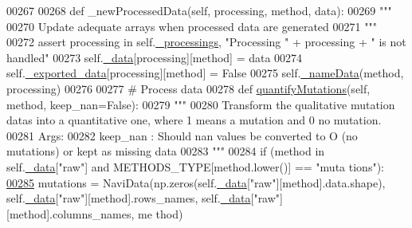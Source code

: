 \begin{DoxyCode}
00267 
00268     \textcolor{keyword}{def }\_newProcessedData(self, processing, method, data):
00269         \textcolor{stringliteral}{"""}
00270 \textcolor{stringliteral}{        Update adequate arrays when processed data are generated}
00271 \textcolor{stringliteral}{        """}
00272         \textcolor{keyword}{assert} processing \textcolor{keywordflow}{in} self.\hyperlink{classnavicom_1_1navicom_1_1NaviCom_ac6a14d6a91cd2f236eef71496a6f249c}{_processings}, \textcolor{stringliteral}{"Processing "} + processing + \textcolor{stringliteral}{" is
       not handled"}
00273         self.\hyperlink{classnavicom_1_1navicom_1_1NaviCom_a407b2b5c30a5652ee85c4be54b3e6679}{_data}[processing][method] = data
00274         self.\hyperlink{classnavicom_1_1navicom_1_1NaviCom_ab7328fbbe89a1b3cb2db8c3d456d958f}{_exported_data}[processing][method] = \textcolor{keyword}{False}
00275         self.\hyperlink{classnavicom_1_1navicom_1_1NaviCom_a140128d0fd12930347cc2375c154072d}{_nameData}(method, processing)
00276 
00277     \textcolor{comment}{# Process data}
00278     \textcolor{keyword}{def }\hyperlink{classnavicom_1_1navicom_1_1NaviCom_a5314c49d6b9749693519a4a86cbfde71}{quantifyMutations}(self, method, keep\_nan=False):
00279         \textcolor{stringliteral}{"""}
00280 \textcolor{stringliteral}{        Transform the qualitative mutation datas into a quantitative one, where 1
       means a mutation and 0 no mutation.}
00281 \textcolor{stringliteral}{        Args:}
00282 \textcolor{stringliteral}{            keep\_nan : Should nan values be converted to O (no mutations) or kept
       as missing data}
00283 \textcolor{stringliteral}{        """}
00284         \textcolor{keywordflow}{if} (method \textcolor{keywordflow}{in} self.\hyperlink{classnavicom_1_1navicom_1_1NaviCom_a407b2b5c30a5652ee85c4be54b3e6679}{_data}[\textcolor{stringliteral}{"raw"}] \textcolor{keywordflow}{and} METHODS\_TYPE[method.lower()] == \textcolor{stringliteral}{"muta
      tions"}):
\hypertarget{navicom_8py_source_l00285}{}\hyperlink{classnavicom_1_1navicom_1_1NaviCom_a5314c49d6b9749693519a4a86cbfde71}{00285}             mutations = NaviData(np.zeros(self.\hyperlink{classnavicom_1_1navicom_1_1NaviCom_a407b2b5c30a5652ee85c4be54b3e6679}{_data}[\textcolor{stringliteral}{"raw"}][method].data.shape), 
      self.\hyperlink{classnavicom_1_1navicom_1_1NaviCom_a407b2b5c30a5652ee85c4be54b3e6679}{_data}[\textcolor{stringliteral}{"raw"}][method].rows\_names, self.\hyperlink{classnavicom_1_1navicom_1_1NaviCom_a407b2b5c30a5652ee85c4be54b3e6679}{_data}[\textcolor{stringliteral}{"raw"}][method].columns\_names, me
      thod)

\end{DoxyCode}
